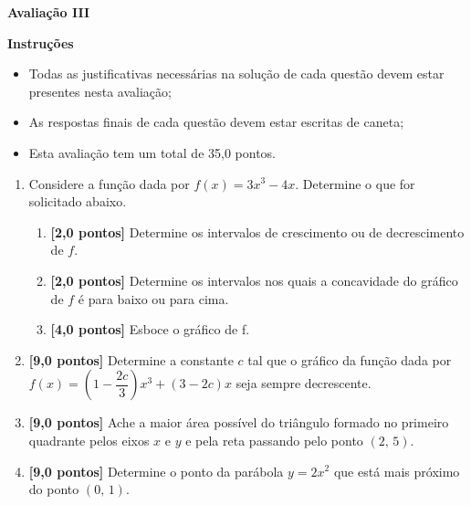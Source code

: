 \documentclass[12pt,a4paper]{article}
\begin{document}
\begin{center}
 \textbf{Avaliação III}
\end{center}

\textbf{Instruções}
\begin{itemize}
 \item Todas as justificativas necessárias na solução de cada questão devem estar presentes nesta avaliação;
 \item As respostas finais de cada questão devem estar escritas de caneta;
 \item Esta avaliação tem um total de 35,0 pontos.
\end{itemize}

\begin{enumerate}
  \item Considere a função dada por $f(x) = 3x^3 - 4x$. 
    Determine o que for solicitado abaixo.
  
    \begin{enumerate}
      \item \textbf{[2,0 pontos]} Determine os intervalos de crescimento ou de decrescimento de $f$.
      \item \textbf{[2,0 pontos]} Determine os intervalos nos quais a concavidade do gráfico de $f$ é para baixo
        ou para cima.
      \item \textbf{[4,0 pontos]} Esboce o gráfico de f.
    \end{enumerate}

  \item \textbf{[9,0 pontos]} Determine a constante $c$ tal que o gráfico da função dada 
  por $f(x) = \left(1 -\dfrac{2c}{3}\right)x^3 + (3 - 2c)x$ seja sempre decrescente.
   
  \item \textbf{[9,0 pontos]} Ache a maior área possível do triângulo formado no primeiro 
  quadrante pelos eixos $x$ e $y$ e pela reta passando pelo ponto $(2,\, 5)$.

  \item \textbf{[9,0 pontos]} Determine o ponto da parábola $y = 2x^2$ que está mais próximo do ponto $(0,\, 1)$. 
    
  \end{enumerate}
\end{document}
